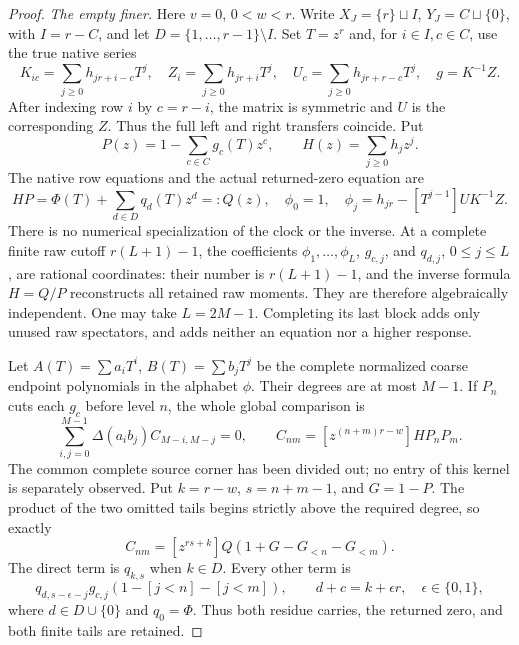 \documentclass[11pt,a4paper]{amsart}
\numberwithin{equation}{section}
\theoremstyle{plain}
\theoremstyle{definition}
\begin{document}
\begin{proof}
\smallskip\noindent\emph{The empty finer.}
Here \(v=0\), \(0<w<r\).  Write
\(X_J=\{r\}\sqcup I\), \(Y_J=C\sqcup\{0\}\), with
\(I=r-C\), and let \(D=\{1,\ldots,r-1\}\setminus I\).
Set \(T=z^r\) and, for \(i\in I,c\in C\), use the true native series
\[
 K_{ic}=\sum_{j\ge0}h_{jr+i-c}T^j,\quad
 Z_i=\sum_{j\ge0}h_{jr+i}T^j,\quad
 U_c=\sum_{j\ge0}h_{jr+r-c}T^j,\quad g=K^{-1}Z.
\]
After indexing row \(i\) by \(c=r-i\), the matrix is symmetric and
\(U\) is the corresponding \(Z\).  Thus the full left and right
transfers coincide.  Put
\[
 P(z)=1-\sum_{c\in C}g_c(T)z^c,
 \qquad H(z)=\sum_{j\ge0}h_jz^j.
\]
The native row equations and the actual returned-zero equation are
\begin{equation}\label{rt:self-empty-coordinates}
 HP=\Phi(T)+\sum_{d\in D}q_d(T)z^d=:Q(z),\quad
 \phi_0=1,\quad
 \phi_j=h_{jr}-[T^{j-1}]UK^{-1}Z.
\end{equation}
There is no numerical specialization of the clock or the inverse.
At a complete finite raw cutoff \(r(L+1)-1\), the coefficients
\(\phi_1,\ldots,\phi_L\), \(g_{c,j}\), and \(q_{d,j}\),
\(0\le j\le L\), are rational coordinates: their number is
\(r(L+1)-1\), and the inverse formula \(H=Q/P\) reconstructs all
retained raw moments.  They are therefore algebraically independent.
One may take \(L=2M-1\).  Completing its last block adds only unused
raw spectators, and adds neither an equation nor a higher response.

Let \(A(T)=\sum a_iT^i\), \(B(T)=\sum b_jT^j\) be the complete
normalized coarse endpoint polynomials in the alphabet \(\phi\).
Their degrees are at most \(M-1\).  If \(P_n\) cuts each \(g_c\) before
level \(n\), the whole global comparison is
\begin{equation}\label{rt:self-empty-scalar}
 \sum_{i,j=0}^{M-1}\Delta(a_i b_j)C_{M-i,M-j}=0,
 \qquad C_{nm}=[z^{(n+m)r-w}]HP_nP_m.
\end{equation}
The common complete source corner has been divided out; no entry of
this kernel is separately observed.  Put \(k=r-w\), \(s=n+m-1\),
and \(G=1-P\).  The product of the two omitted tails begins strictly
above the required degree, so exactly
\begin{equation}\label{rt:self-empty-kernel}
 C_{nm}=[z^{rs+k}]Q(1+G-G_{<n}-G_{<m}).
\end{equation}
The direct term is \(q_{k,s}\) when \(k\in D\).  Every other term is
\[
 q_{d,s-\epsilon-j}g_{c,j}
       (1-[j<n]-[j<m]),
 \qquad d+c=k+\epsilon r,\quad \epsilon\in\{0,1\},
\]
where \(d\in D\cup\{0\}\) and \(q_0=\Phi\).
Thus both residue carries, the returned zero, and both finite tails
are retained.


\end{proof}
\end{document}
